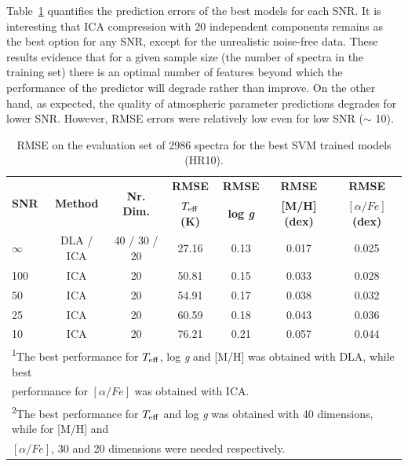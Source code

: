 \documentclass[a4paper,fleqn,usenatbib]{mnras}
\begin{document}
{Table~\ref{tab:01} quantifies the prediction errors of the best models
for each SNR. It is interesting that ICA compression with 20
independent components remains as the best option for any SNR, except
for the unrealistic noise-free data. 
These results evidence that for a given sample
size (the number of spectra in the training set) there is
an optimal number of features beyond which the performance of the
predictor will degrade rather than improve. On the other hand, as
expected, the quality of atmospheric parameter predictions degrades 
for lower SNR. However, RMSE errors were relatively low even for 
low SNR ($\sim$ 10).  

\begin{table}
\centering
\caption{RMSE on the evaluation set of 2986 spectra for the best SVM trained models (HR10).}
\label{tab:01}
\begin{tabular}{l c c c c c c}
\hline
\multirow{2}{*}{\textbf{SNR}} & \multirow{2}{*}{\textbf{Method}} & \multirow{2}{*}{\textbf{Nr. Dim.}} & {\bf RMSE} & {\bf RMSE} & {\bf RMSE} & {\bf RMSE}\\
 &  &  & \textbf{$T_{\rm eff}$ (K)} & \textbf{log \textit{g}} & \textbf{[M/H] (dex)}  & \textbf{$\left[ \alpha/Fe \right]$ (dex)}\\
\hline
$\infty$ & DLA / ICA\protect\footnotemark[1] & 40 / 30 / 20\protect\footnotemark[2] & 27.16 & 0.13 & 0.017 & 0.025\\
100 & ICA & 20 & 50.81 & 0.15 & 0.033 & 0.028\\
50 & ICA & 20 & 54.91 & 0.17 & 0.038 & 0.032\\
25 & ICA & 20 & 60.59 & 0.18 & 0.043 & 0.036\\
10 & ICA & 20 & 76.21 & 0.21 & 0.057 & 0.044\\
\hline
\multicolumn{7}{l}{\textsuperscript{1}\footnotesize{The best performance for $T_{\rm eff}$, log 
		\textit{g} and [M/H] was obtained with DLA,  while best}}\\
\multicolumn{7}{l}{\footnotesize{performance for $\left[ \alpha/Fe \right]$ was obtained with ICA.}}\\
\multicolumn{7}{l}{\textsuperscript{2}\footnotesize{The best performance for $T_{\rm eff}$ and log 
		\textit{g} was obtained with 40 dimensions, while for [M/H] and}}\\ 
		\multicolumn{7}{l}{\footnotesize{ 
		$\left[ \alpha/Fe \right]$, 30 and 20 dimensions were needed respectively.}}
\end{tabular}
\end{table}

}
\end{document}

